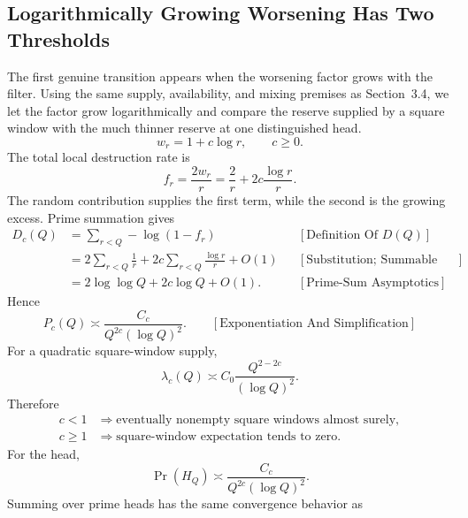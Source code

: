 \subsection{Logarithmically Growing Worsening Has Two Thresholds}
The first genuine transition appears when the worsening factor grows with the filter. Using the same supply, availability, and mixing premises as Section~3.4, we let the factor grow logarithmically and compare the reserve supplied by a square window with the much thinner reserve at one distinguished head.
\begin{equation*}
w_r=1+c\log r,
\qquad c\ge0.
\end{equation*}
The total local destruction rate is
\begin{equation*}
f_r
=\frac{2w_r}{r}
=\frac2r+2c\frac{\log r}{r}.
\end{equation*}
The random contribution supplies the first term, while the second is the growing excess. Prime summation gives
\begin{equation*}
\begin{aligned}
D_c(Q)
&=\sum_{r < Q}-\log(1-f_r)
&&[\text{Definition Of }D(Q)]\\
&=2\sum_{r < Q}\frac1r+2c\sum_{r < Q}\frac{\log r}{r}+O(1)
&&[\text{Substitution; Summable Remainder}]\\
&=2\log\log Q+2c\log Q+O(1).
&&[\text{Prime-Sum Asymptotics}]
\end{aligned}
\end{equation*}
Hence
\begin{equation*}
P_c(Q)
\asymp
\frac{C_c}{Q^{2c}(\log Q)^2}.
\qquad[\text{Exponentiation And Simplification}]
\end{equation*}
For a quadratic square-window supply,
\begin{equation*}
\lambda_c(Q)
\asymp
C_0\frac{Q^{2-2c}}{(\log Q)^2}.
\end{equation*}
Therefore
\begin{equation*}
\begin{aligned}
c < 1
&\Longrightarrow
\text{eventually nonempty square windows almost surely},\\
c\ge1
&\Longrightarrow
\text{square-window expectation tends to zero}.
\end{aligned}
\end{equation*}
For the head,
\begin{equation*}
\Pr(H_Q)
\asymp
\frac{C_c}{Q^{2c}(\log Q)^2}.
\end{equation*}
Summing over prime heads has the same convergence behavior as
